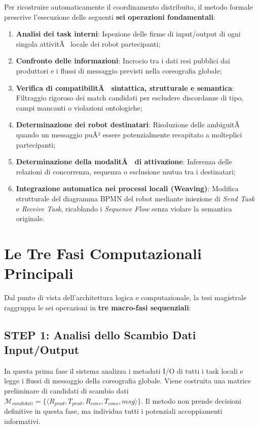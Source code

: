 ﻿\documentclass[11pt, a4paper]{report}
\begin{document}
Per ricostruire automaticamente il coordinamento distribuito, il metodo formale prescrive l'esecuzione delle seguenti \textbf{sei operazioni fondamentali}:

\begin{enumerate}
    \item \textbf{Analisi dei task interni}: Ispezione delle firme di input/output di ogni singola attivitÃ  locale dei robot partecipanti;
    \item \textbf{Confronto delle informazioni}: Incrocio tra i dati resi pubblici dai produttori e i flussi di messaggio previsti nella coreografia globale;
    \item \textbf{Verifica di compatibilitÃ  sintattica, strutturale e semantica}: Filtraggio rigoroso dei match candidati per escludere discordanze di tipo, campi mancanti o violazioni ontologiche;
    \item \textbf{Determinazione dei robot destinatari}: Risoluzione delle ambiguitÃ  quando un messaggio puÃ² essere potenzialmente recapitato a molteplici partecipanti;
    \item \textbf{Determinazione della modalitÃ  di attivazione}: Inferenza delle relazioni di concorrenza, sequenza o esclusione mutua tra i destinatari;
    \item \textbf{Integrazione automatica nei processi locali (Weaving)}: Modifica strutturale del diagramma BPMN del robot mediante iniezione di \textit{Send Task} e \textit{Receive Task}, ricablando i \textit{Sequence Flow} senza violare la semantica originale.
\end{enumerate}

\section{Le Tre Fasi Computazionali Principali}

Dal punto di vista dell'architettura logica e computazionale, la tesi magistrale raggruppa le sei operazioni in \textbf{tre macro-fasi sequenziali}:

\subsection{STEP 1: Analisi dello Scambio Dati Input/Output}
In questa prima fase il sistema analizza i metadati I/O di tutti i task locali e legge i flussi di messaggio della coreografia globale. Viene costruita una matrice preliminare di candidati di scambio dati $\mathcal{M}_{candidati} = \{\langle R_{prod}, T_{prod}, R_{cons}, T_{cons}, msg \rangle\}$. Il metodo non prende decisioni definitive in questa fase, ma individua tutti i potenziali accoppiamenti informativi.
\end{document}
